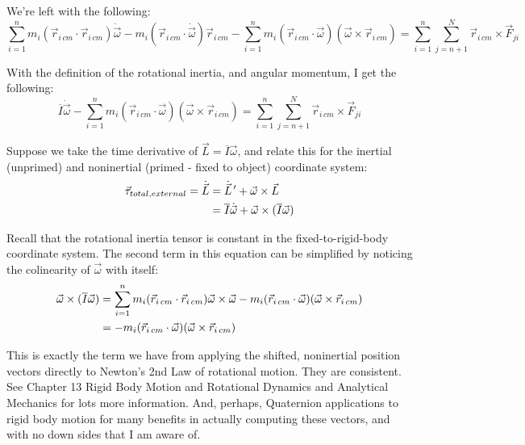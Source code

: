 \documentclass[10pt]{article}
\begin{document}
We're left with the following:
\begin{equation}
    \sum_{i=1}^n 
        m_i(\vec{r}_{i\,cm}\cdot\vec{r}_{i\,cm})\dot{\vec{\omega}} - 
        m_i(\vec{r}_{i\,cm}\cdot\dot{\vec{\omega}})\vec{r}_{i\,cm} -
     \sum_{i=1}^n m_i
        (\vec{r}_{i\,cm}\cdot\vec{\omega})(\vec{\omega}\times\vec{r}_{i\,cm})
        =\sum_{i=1}^n\sum_{j=n+1}^N \vec{r}_{i\,cm}\times\vec{F}_{ji}
\end{equation}

With the definition of the rotational inertia, and angular momentum, I get the 
following:
\begin{equation}
   \overline{I}\dot{\vec{\omega}} - \sum_{i=1}^n m_i
        (\vec{r}_{i\,cm}\cdot\vec{\omega})(\vec{\omega}\times\vec{r}_{i\,cm})
        =\sum_{i=1}^n\sum_{j=n+1}^N \vec{r}_{i\,cm}\times\vec{F}_{ji} 
        \label{t2noninertial}
\end{equation}

Suppose we take the time derivative of 
$\vec{L}=\overline{I}\vec{\omega}$, and relate this for the 
inertial (unprimed) and noninertial (primed - fixed to object) coordinate 
system:
\begin{align}
    \vec{\tau}_{total,external} = \dot{\vec{L}} &= \dot{\vec{L}}^{\,\prime} 
        + \vec{\omega}\times\vec{L} \notag\\
    &= \overline{I}\dot{\vec{\omega}} + \vec{\omega}\times
        (\overline{I}\vec{\omega})
\end{align}

Recall that the rotational inertia tensor is constant in the 
fixed-to-rigid-body coordinate system. The second term in this equation 
can be simplified by noticing the colinearity of $\vec{\omega}$ with itself:
\begin{align}
    \vec{\omega}\times(\overline{I}\vec{\omega})
        &=\sum_{i=1}^n 
        m_i(\vec{r}_{i\,cm}\cdot\vec{r}_{i\,cm})\vec{\omega}
        \times{\vec{\omega}} - 
        m_i(\vec{r}_{i\,cm}\cdot\vec{\omega})(\vec{\omega}
        \times\vec{r}_{i\,cm}) \notag\\
    &=-m_i(\vec{r}_{i\,cm}\cdot\vec{\omega})(\vec{\omega}
        \times\vec{r}_{i\,cm})
\end{align}

This is exactly the term we have from applying the 
shifted, noninertial position vectors 
directly to Newton's 2nd Law of rotational 
motion. They are consistent. 
See Chapter 13 Rigid Body Motion and Rotational Dynamics and Analytical 
Mechanics for lots more information. And, perhaps, Quaternion applications 
to rigid body motion for many benefits in actually computing these vectors, 
and with no down sides that I am aware of.
\end{document}
